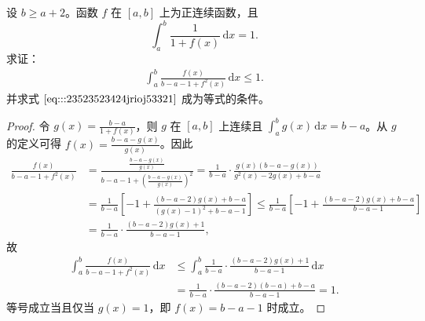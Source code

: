 \documentclass[../../main.tex]{subfiles}%
\begin{document}
\begin{example}
设 \( b \geqslant a + 2 \)。函数 \( f \) 在 \([a,b]\) 上为正连续函数，且
\[
\int_{a}^{b} \frac{1}{1 + f(x)} \, \mathrm{d}x = 1.
\]
求证：
\begin{align}
\int_{a}^{b} \frac{f(x)}{b - a - 1 + f^2(x)} \, \mathrm{d}x \leqslant 1. \label{eq:::23523523424jrioj53321}
\end{align}
并求式 \(\eqref{eq:::23523523424jrioj53321}\) 成为等式的条件。
\end{example}
\begin{proof}

令 \( g(x) = \frac{b - a}{1 + f(x)} \)，则 \( g \) 在 \([a,b]\) 上连续且 \( \int_{a}^{b} g(x) \, \mathrm{d}x = b - a \)。从 \( g \) 的定义可得 \( f(x) = \frac{b - a - g(x)}{g(x)} \)。因此
\begin{align*}
\frac{f(x)}{b-a-1+f^2(x)}&=\frac{\frac{b-a-g(x)}{g(x)}}{b-a-1+\left( \frac{b-a-g(x)}{g(x)} \right) ^2}=\frac{1}{b-a}\cdot \frac{g(x)(b-a-g(x))}{g^2(x)-2g(x)+b-a}
\\
&=\frac{1}{b-a}\left[ -1+\frac{(b-a-2)g(x)+b-a}{(g(x)-1)^2+b-a-1} \right] \leqslant \frac{1}{b-a}\left[ -1+\frac{(b-a-2)g(x)+b-a}{b-a-1} \right] 
\\
&=\frac{1}{b-a}\cdot \frac{(b-a-2)g(x)+1}{b-a-1},
\end{align*}
故
\begin{align*}
\int_a^b{\frac{f(x)}{b-a-1+f^2(x)}\,\mathrm{d}x}&\leqslant \int_a^b{\frac{1}{b-a}}\cdot \frac{(b-a-2)g(x)+1}{b-a-1}\,\mathrm{d}x
\\
&=\frac{1}{b-a}\cdot \frac{(b-a-2)(b-a)+b-a}{b-a-1}=1.
\end{align*}
等号成立当且仅当 \( g(x) = 1 \)，即 \( f(x) = b - a - 1 \) 时成立。

\end{proof}
\end{document}
